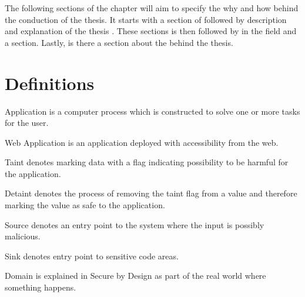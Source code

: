 The following sections of the chapter will aim to specify the why and how behind the conduction of the thesis. It starts with a section of \textit{} followed by \textit{} description and explanation of the thesis \textit{}. These sections is then followed by \textit{} in the field and a \textit{} section. Lastly, is there a section about the \textit{} behind the thesis.


\section{Definitions}
\label{Definitions}
\begin{definition}{Application}
	is a computer process which is constructed to solve one or more tasks for the user.
	\\
\end{definition}

\begin{definition}{Web Application}
	is an application deployed with accessibility from the web.
	\\
\end{definition}

\begin{definition}{Taint}
	denotes marking data with a flag indicating possibility to be harmful for the application.
	\\
\end{definition}

\begin{definition}{Detaint}
	denotes the process of removing the taint flag from a value and therefore marking the value as safe to the application.
	\\
\end{definition}

\begin{definition}{Source}
	denotes an entry point to the system where the input is possibly malicious.
	\\
\end{definition}

\begin{definition}{Sink}
	denotes entry point to sensitive code areas.
	\\
\end{definition}

\begin{definition}{Domain}
	is explained in Secure by Design \parencite{sbd2018} as part of the real world where something happens.
	\\
\end{definition}

